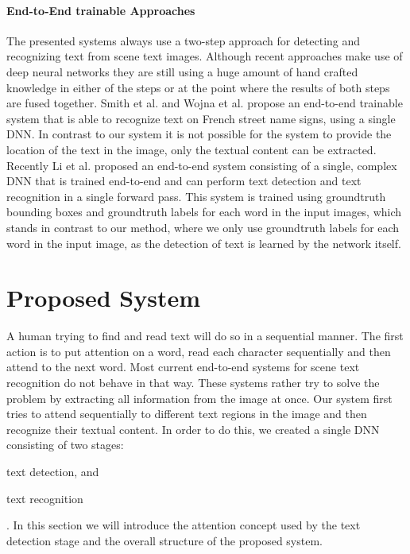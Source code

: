 \documentclass[letterpaper]{article}
\begin{document}
	\paragraph{End-to-End trainable Approaches}
		The presented systems always use a two-step approach for detecting and recognizing text from scene text images.
		Although recent approaches make use of deep neural networks they are still using a huge amount of hand crafted knowledge in either of the steps or at the point where the results of both steps are fused together.
		Smith et al. \cite{Smith2016EndToEnd} and Wojna et al. \cite{Wojna2017AttentionBased} propose an end-to-end trainable system that is able to recognize text on French street name signs, using a single \ac{DNN}.
		In contrast to our system it is not possible for the system to provide the location of the text in the image, only the textual content can be extracted.
		Recently Li et al. \cite{Li2017Towards} proposed an end-to-end system consisting of a single, complex \ac{DNN} that is trained end-to-end and can perform text detection and text recognition in a single forward pass.
		This system is trained using groundtruth bounding boxes and groundtruth labels for each word in the input images, which stands in contrast to our method, where we only use groundtruth labels for each word in the input image, as the detection of text is learned by the network itself.

	\section{Proposed System}
	\label{sec:proposed_system}

	A human trying to find and read text will do so in a sequential manner.
	The first action is to put attention on a word, read each character sequentially and then attend to the next word.
	Most current end-to-end systems for scene text recognition do not behave in that way.
	These systems rather try to solve the problem by extracting all information from the image at once.
	Our system first tries to attend sequentially to different text regions in the image and then recognize their textual content.
	In order to do this, we created a single \ac{DNN} consisting of two stages:
	\begin{enumerate*}[label={(\arabic*)}]
		\item text detection, and
		\item text recognition
	\end{enumerate*}.
	In this section we will introduce the attention concept used by the text detection stage and the overall structure of the proposed system.
\end{document}
